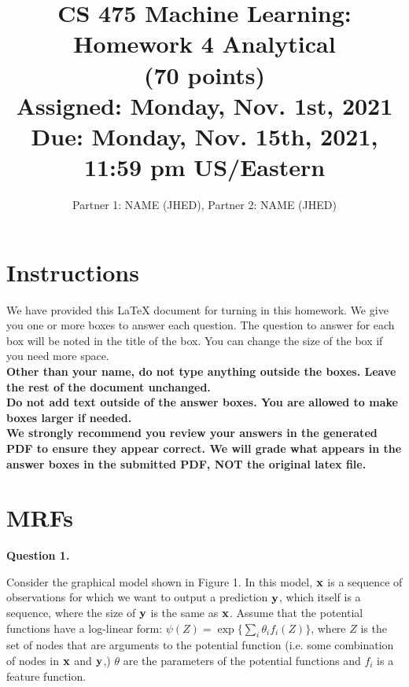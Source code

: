 \documentclass[11pt]{article}
\title{CS 475 Machine Learning: Homework 4 Analytical \\
(70 points)\\
\Large{Assigned: Monday, Nov. 1st, 2021} \\
\Large{Due: Monday, Nov. 15th, 2021, 11:59 pm US/Eastern}}
\author{Partner 1: NAME (JHED), Partner 2:  NAME (JHED)}
\date{}
\newcommand{\vx}{{\bf x}}
\newcommand{\vy}{{\bf y}}
\begin{document}
\maketitle
\thispagestyle{headings}

\section*{Instructions }
We have provided this \LaTeX{} document for turning in this homework. We give you one or more boxes to answer each question.  The question to answer for each box will be noted in the title of the box.  You can change the size of the box if you need more space.\\

{\bf Other than your name, do not type anything outside the boxes. Leave the rest of the document unchanged.}\\


\textbf{
  Do
  not add text outside of the answer boxes.  You are allowed to make boxes larger if needed.
  }\\


\textbf{We strongly recommend you review your answers in the generated PDF to
  ensure they appear correct. We will grade what appears in the answer boxes in
  the submitted PDF, NOT the original latex file.}


\pagebreak
\section*{MRFs}

{\bf Question 1.}

Consider the graphical model shown in Figure 1. In this model, $\vx$ is a sequence of observations for which we want to output a prediction $\vy$, which itself is a sequence, where the size of $\vy$ is the same as $\vx$. Assume that the potential functions have a log-linear form: $\psi(Z) = \exp\{\sum_i \theta_i f_i(Z)\}$, where $Z$ is the set of nodes that are arguments to the potential function (i.e. some combination of nodes in $\vx$ and $\vy$,) $\theta$ are the parameters of the potential functions and $f_i$ is a feature function.
\end{document}
